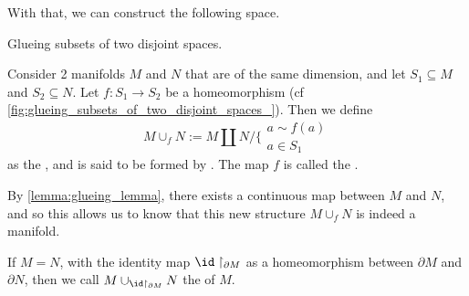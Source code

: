 \documentclass[notoc,notitlepage]{tufte-book}
\begin{document}
With that, we can construct the following space.

\begin{defn}\label{defn:adjunction_space}
  \begin{marginfigure}
    \centering
    \caption{Glueing subsets of two disjoint spaces.}\label{fig:glueing_subsets_of_two_disjoint_spaces_}
  \end{marginfigure}
  Consider 2 manifolds $M$ and $N$ that are of the same dimension, and let $S_1
  \subseteq M$ and $S_2 \subseteq N$. Let $f : S_1 \to S_2$ be a homeomorphism (cf
  \cref{fig:glueing_subsets_of_two_disjoint_spaces_}). Then we define
  \begin{equation*}
    M \cup_f N := M \coprod N \Big/ \Big\lbrace \substack{a \sim f(a) \\ a \in S_1}
  \end{equation*}
  as the , and is said to be formed by 
  . The map $f$ is called the .
\end{defn}

\begin{remark}
  By \cref{lemma:glueing_lemma}, there exists a continuous map between $M$ and $N$, and so this
  allows us to know that this new structure $M \cup_f N$ is indeed a manifold.
\end{remark}

\begin{defn}[Double]\label{defn:double}
  If $M = N$, with the identity map $\id \restriction_{\partial M}$ as a homeomorphism between
  $\partial M$ and $\partial N$, then we call $M \cup_{\id \restriction_{\partial M}} N$ the
   of $M$.
\end{defn}
\end{document}
